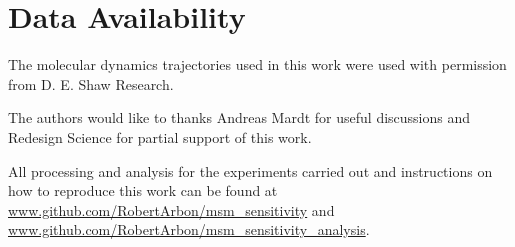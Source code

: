 \documentclass[journal=jacsat,manuscript=article]{achemso}
\begin{document}
\section{Data Availability}

The molecular dynamics trajectories used in this work were used with permission from D. E. Shaw Research. 

\begin{acknowledgement}

The authors would like to thanks Andreas Mardt for useful discussions and Redesign Science for partial support of this work. 

\end{acknowledgement}

\begin{suppinfo}
All processing and analysis for the experiments carried out and instructions on how to reproduce this work can be found at \url{www.github.com/RobertArbon/msm_sensitivity} and \url{www.github.com/RobertArbon/msm_sensitivity_analysis}. 

\end{suppinfo}


%
\end{document}
